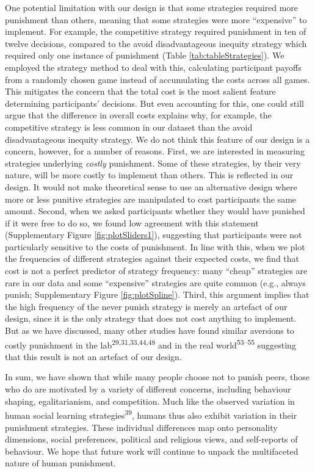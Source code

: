 \documentclass[
  english,
  man, donotrepeattitle,floatsintext]{apa6}
\begin{document}
One potential limitation with our design is that some strategies required more
punishment than others, meaning that some strategies were more ``expensive'' to
implement. For example, the competitive strategy required punishment in ten of
twelve decisions, compared to the avoid disadvantageous inequity strategy which
required only one instance of punishment (Table \ref{tab:tableStrategies}).
We employed the strategy method to deal with this, calculating participant
payoffs from a randomly chosen game instead of accumulating the costs across
all games. This mitigates the concern that the total cost is the most salient
feature determining participants' decisions. But even accounting for this,
one could still argue that the difference in overall costs explains why, for
example, the competitive strategy is less common in our dataset than the avoid
disadvantageous inequity strategy. We do not think this feature of our design
is a concern, however, for a number of reasons. First, we are interested in
measuring strategies underlying \emph{costly} punishment. Some of these strategies,
by their very nature, will be more costly to implement than others. This is
reflected in our design. It would not make theoretical sense to use an
alternative design where more or less punitive strategies are manipulated to
cost participants the same amount. Second, when we asked participants whether
they would have punished if it were free to do so, we found low agreement
with this statement (Supplementary Figure \ref{fig:plotSliders1}),
suggesting that participants were not particularly sensitive to the costs of
punishment. In line with this, when we plot the frequencies of different
strategies against their expected costs, we find that cost is not a perfect
predictor of strategy frequency: many ``cheap'' strategies are rare in our
data and some ``expensive'' strategies are quite common (e.g., always punish;
Supplementary Figure \ref{fig:plotSpline}). Third, this argument implies
that the high frequency of the never punish strategy is merely an artefact
of our design, since it is the only strategy that does not cost anything to
implement. But as we have discussed, many other studies have found similar
aversions to costly punishment in the lab\textsuperscript{29,31,33,44,48} and in the real world\textsuperscript{53--55} suggesting that this result is
not an artefact of our design.

In sum, we have shown that while many people choose not to punish peers, those
who do are motivated by a variety of different concerns, including behaviour
shaping, egalitarianism, and competition. Much like the observed variation in
human social learning strategies\textsuperscript{39}, humans thus also exhibit
variation in their punishment strategies. These individual differences map onto
personality dimensions, social preferences, political and religious views, and
self-reports of behaviour. We hope that future work will continue to unpack the
multifaceted nature of human punishment.
\end{document}
